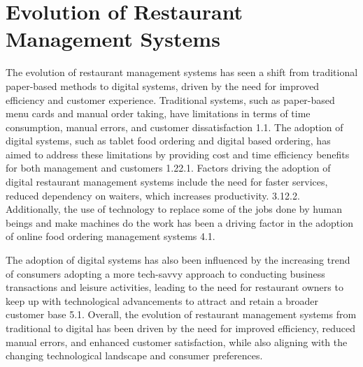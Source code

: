 \section{Evolution of Restaurant Management Systems}
The evolution of restaurant management systems has seen a shift from traditional paper-based methods to digital systems, driven by the need for improved efficiency and customer experience. Traditional systems, such as paper-based menu cards and manual order taking, have limitations in terms of time consumption, manual errors, and customer dissatisfaction 1.1. The adoption of digital systems, such as tablet food ordering and digital based ordering, has aimed to address these limitations by providing cost and time efficiency benefits for both management and customers 1.22.1.
Factors driving the adoption of digital restaurant management systems include the need for faster services, reduced dependency on waiters, which increases productivity. 3.12.2. Additionally, the use of technology to replace some of the jobs done by human beings and make machines do the work has been a driving factor in the adoption of online food ordering management systems 4.1.

The adoption of digital systems has also been influenced by the increasing trend of consumers adopting a more tech-savvy approach to conducting business transactions and leisure activities, leading to the need for restaurant owners to keep up with technological advancements to attract and retain a broader customer base 5.1.
Overall, the evolution of restaurant management systems from traditional to digital has been driven by the need for improved efficiency, reduced manual errors, and enhanced customer satisfaction, while also aligning with the changing technological landscape and consumer preferences.

